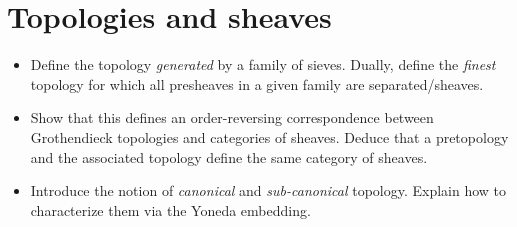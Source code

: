 \documentclass[12pt,a4paper]{amsart}
\theoremstyle{plain}
\theoremstyle{definition}
\theoremstyle{remark}
\begin{document}
\section{Topologies and sheaves}

\begin{itemize}
  \item Define the topology \textit{generated} by a family of sieves.
    Dually, define the \textit{finest} topology for which all presheaves in a given family are separated/sheaves.
  \item Show that this defines an order-reversing correspondence between Grothendieck topologies and categories of sheaves.
    Deduce that a pretopology and the associated topology define the same category of sheaves.
  \item Introduce the notion of \textit{canonical} and \textit{sub-canonical} topology.
    Explain how to characterize them via the Yoneda embedding.
\end{itemize}

\printbibliography
\vfill
\end{document}
